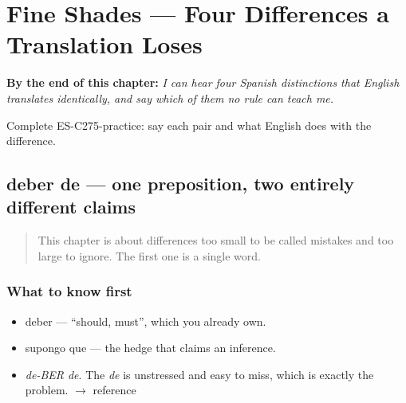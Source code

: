 
\chapter{Fine Shades --- Four Differences a Translation Loses}
\label{ch:matices}

\begin{chapteropening}
\textbf{By the end of this chapter:} \emph{I can hear four Spanish distinctions that English translates identically, and say which of them no rule can teach me.}

Complete ES-C275-practice: say each pair and what English does with the difference.
\end{chapteropening}

\section[deber de]{deber de — one preposition, two entirely different claims}

\label{lesson:ES-C275-deber-de}



\begin{quote}
This chapter is about differences too small to be called mistakes and too large to ignore. The first one is a single word.
\end{quote}

\subsection*{What to know first}
\begin{itemize}
\raggedright
  \item deber — \textquotedblleft{}should, must\textquotedblright{}, which you already own.
  \item supongo que — the hedge that claims an inference.
\end{itemize}

\begin{sounds}
\begin{itemize}
\raggedright
  \item \emph{de-BER de}. The \emph{de} is unstressed and easy to miss, which is exactly the problem. $\to$ reference
\end{itemize}
\end{sounds}

